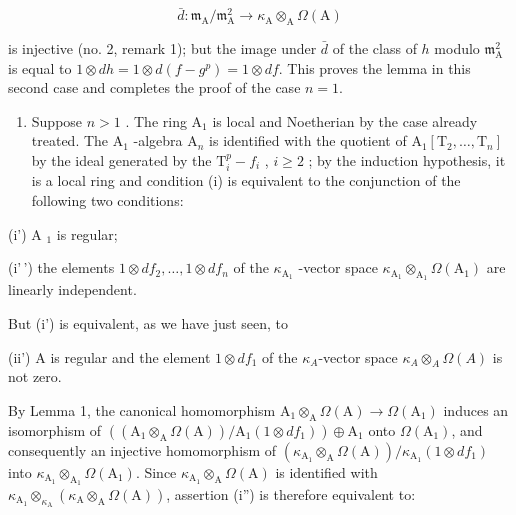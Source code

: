 \[
\bar {d}: \mathfrak {m} _ {\mathrm{A}} / \mathfrak {m} _ {\mathrm{A}} ^ {2} \to \kappa_ {\mathrm{A}} \otimes_ {\mathrm{A}} \Omega (\mathrm{A})
\]

is injective (no. 2, remark 1); but the image under \(\bar{d}\) of the class of \(h\) modulo \(\mathfrak{m}_{\mathrm{A}}^{2}\) is equal to \(1 \otimes dh = 1 \otimes d(f - g^{p}) = 1 \otimes df\). This proves the lemma in this second case and completes the proof of the case \(n = 1\).

\begin{enumerate}
\def\labelenumi{\Alph{enumi})}
\setcounter{enumi}{1}
\tightlist
\item
  Suppose \(n > 1\) . The ring \(\mathrm{A}_{1}\) is local and Noetherian by the case already treated. The \(\mathrm{A}_{1}\) -algebra \(\mathrm{A}_{n}\) is identified with the quotient of \(\mathrm{A}_{1}[\mathrm{T}_{2},\ldots ,\mathrm{T}_{n}]\) by the ideal generated by the \(\mathrm{T}_i^p -f_i\) , \(i\geqslant 2\) ; by the induction hypothesis, it is a local ring and condition (i) is equivalent to the conjunction of the following two conditions:
\end{enumerate}

(i') A \(_{1}\) is regular;

(i'\,') the elements \(1 \otimes df_2, \ldots, 1 \otimes df_n\) of the \(\kappa_{\mathrm{A}_1}\) -vector space \(\kappa_{\mathrm{A}_1} \otimes_{\mathrm{A}_1} \Omega(\mathrm{A}_1)\) are linearly independent.

But (i') is equivalent, as we have just seen, to

(ii') A is regular and the element \(1 \otimes df_{1}\) of the \(\kappa_{A}\)-vector space \(\kappa_{A} \otimes_{A} \Omega(A)\) is not zero.

By Lemma 1, the canonical homomorphism \(\mathrm{A}_{1} \otimes_{\mathrm{A}} \Omega(\mathrm{A}) \to \Omega(\mathrm{A}_{1})\) induces an isomorphism of \(((\mathrm{A}_{1} \otimes_{\mathrm{A}} \Omega(\mathrm{A})) / \mathrm{A}_{1}(1 \otimes df_{1})) \oplus \mathrm{A}_{1}\) onto \(\Omega(\mathrm{A}_{1})\), and consequently an injective homomorphism of \((\kappa_{\mathrm{A}_{1}} \otimes_{\mathrm{A}} \Omega(\mathrm{A})) / \kappa_{\mathrm{A}_{1}}(1 \otimes df_{1})\) into \(\kappa_{\mathrm{A}_{1}} \otimes_{\mathrm{A}_{1}} \Omega(\mathrm{A}_{1})\). Since \(\kappa_{\mathrm{A}_{1}} \otimes_{\mathrm{A}} \Omega(\mathrm{A})\) is identified with \(\kappa_{\mathrm{A}_{1}} \otimes_{\kappa_{\mathrm{A}}} (\kappa_{\mathrm{A}} \otimes_{\mathrm{A}} \Omega(\mathrm{A}))\), assertion (i'') is therefore equivalent to:

